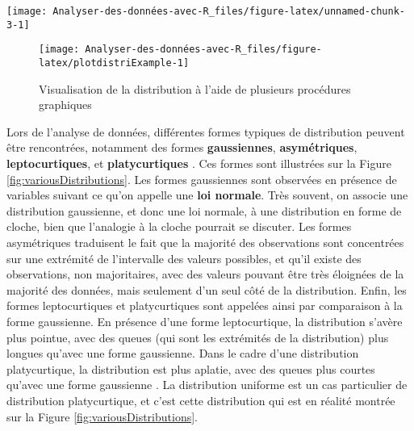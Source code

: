 \documentclass[
  french,
]{book}
\begin{document}
\begin{center}\texttt{[image: Analyser-des-données-avec-R\_files/figure-latex/unnamed-chunk-3-1]} \end{center}

\begin{figure}

{\centering \texttt{[image: Analyser-des-données-avec-R\_files/figure-latex/plotdistriExample-1]} 

}

\caption{Visualisation de la distribution à l'aide de plusieurs procédures graphiques}\label{fig:plotdistriExample}
\end{figure}

Lors de l'analyse de données, différentes formes typiques de distribution peuvent être rencontrées, notamment des formes \textbf{gaussiennes}, \textbf{asymétriques}, \textbf{leptocurtiques}, et \textbf{platycurtiques} \autocite{dartCommentDecrireDistribution2003}. Ces formes sont illustrées sur la Figure \ref{fig:variousDistributions}. Les formes gaussiennes sont observées en présence de variables suivant ce qu'on appelle une \textbf{loi normale}. Très souvent, on associe une distribution gaussienne, et donc une loi normale, à une distribution en forme de cloche, bien que l'analogie à la cloche pourrait se discuter. Les formes asymétriques traduisent le fait que la majorité des observations sont concentrées sur une extrémité de l'intervalle des valeurs possibles, et qu'il existe des observations, non majoritaires, avec des valeurs pouvant être très éloignées de la majorité des données, mais seulement d'un seul côté de la distribution. Enfin, les formes leptocurtiques et platycurtiques sont appelées ainsi par comparaison à la forme gaussienne. En présence d'une forme leptocurtique, la distribution s'avère plus pointue, avec des queues (qui sont les extrémités de la distribution) plus longues qu'avec une forme gaussienne. Dans le cadre d'une distribution platycurtique, la distribution est plus aplatie, avec des queues plus courtes qu'avec une forme gaussienne \autocite{dartCommentDecrireDistribution2003}. La distribution uniforme est un cas particulier de distribution platycurtique, et c'est cette distribution qui est en réalité montrée sur la Figure \ref{fig:variousDistributions}.
\end{document}
